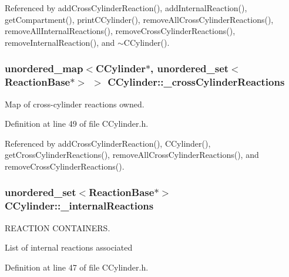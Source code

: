 Referenced by add\+Cross\+Cylinder\+Reaction(), add\+Internal\+Reaction(), get\+Compartment(), print\+C\+Cylinder(), remove\+All\+Cross\+Cylinder\+Reactions(), remove\+All\+Internal\+Reactions(), remove\+Cross\+Cylinder\+Reactions(), remove\+Internal\+Reaction(), and $\sim$\+C\+Cylinder().

\hypertarget{classCCylinder_a4263400be58cd0e11e0be99a42595c88}{
\subsubsection[{\+\_\+cross\+Cylinder\+Reactions}]{\setlength{\rightskip}{0pt plus 5cm}unordered\+\_\+map$<${\bf C\+Cylinder}$\ast$, unordered\+\_\+set$<${\bf Reaction\+Base}$\ast$$>$ $>$ C\+Cylinder\+::\+\_\+cross\+Cylinder\+Reactions\hspace{0.3cm}{\ttfamily [private]}}}\label{classCCylinder_a4263400be58cd0e11e0be99a42595c88}


Map of cross-\/cylinder reactions owned. 



Definition at line 49 of file C\+Cylinder.\+h.



Referenced by add\+Cross\+Cylinder\+Reaction(), C\+Cylinder(), get\+Cross\+Cylinder\+Reactions(), remove\+All\+Cross\+Cylinder\+Reactions(), and remove\+Cross\+Cylinder\+Reactions().

\hypertarget{classCCylinder_a2f377a8697a4b4e053e747287e7a6a09}{
\subsubsection[{\+\_\+internal\+Reactions}]{\setlength{\rightskip}{0pt plus 5cm}unordered\+\_\+set$<${\bf Reaction\+Base}$\ast$$>$ C\+Cylinder\+::\+\_\+internal\+Reactions\hspace{0.3cm}{\ttfamily [private]}}}\label{classCCylinder_a2f377a8697a4b4e053e747287e7a6a09}


R\+E\+A\+C\+T\+I\+O\+N C\+O\+N\+T\+A\+I\+N\+E\+R\+S. 

List of internal reactions associated 

Definition at line 47 of file C\+Cylinder.\+h.



